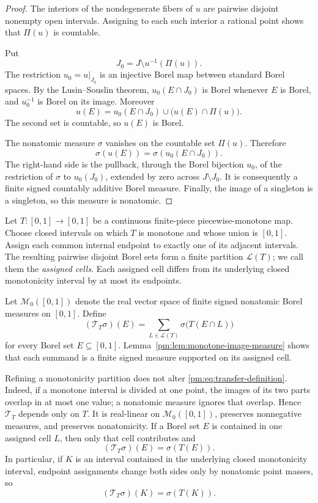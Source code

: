 \documentclass[11pt]{article}
\theoremstyle{definition}
\theoremstyle{remark}
\newcommand{\I}{[0,1]}
\newcommand{\M}{\mathcal M_0}
\newcommand{\T}{\mathcal T}
\newcommand{\Lap}{\mathscr L}
\begin{document}
\begin{proof}
The interiors of the nondegenerate fibers of $u$ are pairwise disjoint
nonempty open intervals.  Assigning to each such interior a rational point
shows that $\Pi(u)$ is countable.

Put
\[
 J_0=J\setminus u^{-1}(\Pi(u)).
\]
The restriction $u_0=u|_{J_0}$ is an injective Borel map between standard
Borel spaces.  By the Lusin--Souslin theorem, $u_0(E\cap J_0)$ is Borel
whenever $E$ is Borel, and $u_0^{-1}$ is Borel on its image.  Moreover
\[
 u(E)=u_0(E\cap J_0)\cup\bigl(u(E)\cap\Pi(u)\bigr).
\]
The second set is countable, so $u(E)$ is Borel.

The nonatomic measure $\sigma$ vanishes on the countable set $\Pi(u)$.
Therefore
\[
 \sigma(u(E))=\sigma(u_0(E\cap J_0)).
\]
The right-hand side is the pullback, through the Borel bijection $u_0$, of
the restriction of $\sigma$ to $u_0(J_0)$, extended by zero across
$J\setminus J_0$.  It is consequently a finite signed countably additive
Borel measure.  Finally, the image of a singleton is a singleton, so this
measure is nonatomic.
\end{proof}

Let $T:\I\to\I$ be a continuous finite-piece piecewise-monotone map.
Choose closed intervals on which $T$ is monotone and whose union is $\I$.
Assign each common internal endpoint to exactly one of its adjacent
intervals.  The resulting pairwise disjoint Borel sets form a finite
partition $\Lap(T)$; we call them the \emph{assigned cells}.  Each assigned
cell differs from its underlying closed monotonicity interval by at most its
endpoints.

Let $\M(\I)$ denote the real vector space of finite signed nonatomic Borel
measures on $\I$.  Define
\begin{equation}\label{pm:eq:transfer-definition}
 (\T_T\sigma)(E)
 =\sum_{L\in\Lap(T)}\sigma\bigl(T(E\cap L)\bigr)
\end{equation}
for every Borel set $E\subseteq\I$.  Lemma~\ref{pm:lem:monotone-image-measure}
shows that each summand is a finite signed measure supported on its assigned
cell.

Refining a monotonicity partition does not alter
\eqref{pm:eq:transfer-definition}.  Indeed, if a monotone interval is divided
at one point, the images of its two parts overlap in at most one value; a
nonatomic measure ignores that overlap.  Hence $\T_T$ depends only on $T$.
It is real-linear on $\M(\I)$, preserves nonnegative
measures, and preserves nonatomicity.  If a Borel set $E$ is contained in
one assigned cell $L$, then only that cell contributes and
\[
 (\T_T\sigma)(E)=\sigma(T(E)).
\]
In particular, if $K$ is an interval contained in the underlying closed
monotonicity interval, endpoint assignments change both sides only by
nonatomic point masses, so
\begin{equation}\label{pm:eq:single-lap-scaling}
 (\T_T\sigma)(K)=\sigma(T(K)).
\end{equation}
\end{document}
